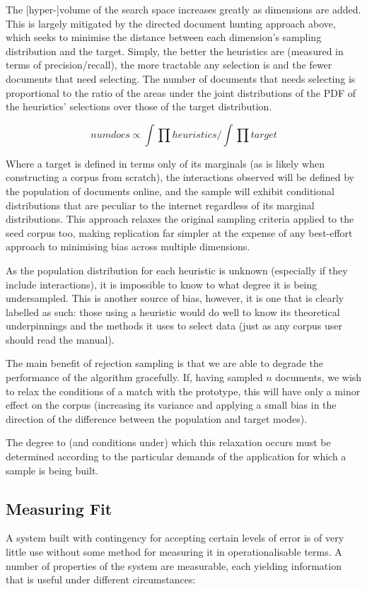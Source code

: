The [hyper-]volume of the search space increases greatly as dimensions are added.  This is largely mitigated by the directed document hunting approach above, which seeks to minimise the distance between each dimension's sampling distribution and the target.  Simply, the better the heuristics are (measured in terms of precision/recall), the more tractable any selection is and the fewer documents that need selecting.  The number of documents that needs selecting is proportional to the ratio of the areas under the joint distributions of the PDF of the heuristics' selections over those of the target distribution.

$$
numdocs \propto \int{\prod{heuristics}} / \int{\prod{target}}
$$

Where a target is defined in terms only of its marginals (as is likely when constructing a corpus from scratch), the interactions observed will be defined by the population of documents online, and the sample will exhibit conditional distributions that are peculiar to the internet regardless of its marginal distributions.  This approach relaxes the original sampling criteria applied to the seed corpus too, making replication far simpler at the expense of any best-effort approach to minimising bias across multiple dimensions.

As the population distribution for each heuristic is unknown (especially if they include interactions), it is impossible to know to what degree it is being undersampled.  This is another source of bias, however, it is one that is clearly labelled as such: those using a heuristic would do well to know its theoretical underpinnings and the methods it uses to select data (just as any corpus user should read the manual).

The main benefit of rejection sampling is that we are able to degrade the performance of the algorithm gracefully.  If, having sampled $n$ documents, we wish to relax the conditions of a match with the prototype, this will have only a minor effect on the corpus (increasing its variance and applying a small bias in the direction of the difference between the population and target modes).  

The degree to (and conditions under) which this relaxation occurs must be determined according to the particular demands of the application for which a sample is being built.



\subsection{Measuring Fit}
A system built with contingency for accepting certain levels of error is of very little use without some method for measuring it in operationalisable terms. A number of properties of the system are measurable, each yielding information that is useful under different circumstances:


